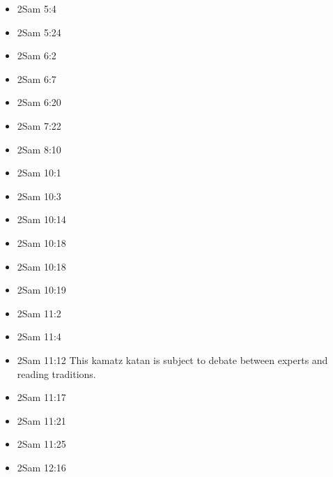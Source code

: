\documentclass[14pt]{book}
\begin{document}
\begin{multicols}{2}
\begin{itemize}
							\item 2Sam 5:4
							
							\item 2Sam 5:24
							
							\item 2Sam 6:2
							
							\item 2Sam 6:7
							
							\item 2Sam 6:20
							
							\item 2Sam 7:22
							
							\item 2Sam 8:10
							
							\item 2Sam 10:1
							
							\item 2Sam 10:3
							
							\item 2Sam 10:14
							
							\item 2Sam 10:18
							
							\item 2Sam 10:18
							
							\item 2Sam 10:19
							
							\item 2Sam 11:2
							
							\item 2Sam 11:4
							
							\item 2Sam 11:12 This kamatz katan is subject to debate between experts and reading traditions.
							
							\item 2Sam 11:17
							
							\item 2Sam 11:21
							
							\item 2Sam 11:25
							
							\item 2Sam 12:16
							

\end{itemize}
\end{multicols}
\end{document}
